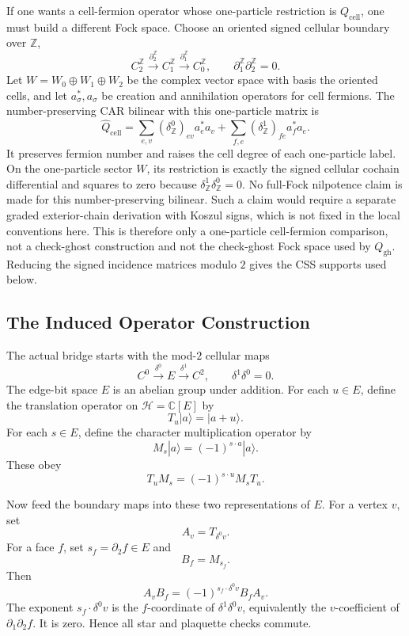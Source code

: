 If one wants a cell-fermion operator whose one-particle restriction is
\(Q_{\mathrm{cell}}\), one must build a different Fock space. Choose an
oriented signed cellular boundary over \(\mathbb Z\),
\[
  C_2^{\mathbb Z}\xrightarrow{\partial_2^{\mathbb Z}}
  C_1^{\mathbb Z}\xrightarrow{\partial_1^{\mathbb Z}} C_0^{\mathbb Z},
  \qquad
  \partial_1^{\mathbb Z}\partial_2^{\mathbb Z}=0.
\]
Let \(W=W_0\oplus W_1\oplus W_2\) be the complex vector space with basis the
oriented cells, and let \(a_\sigma^*,a_\sigma\) be creation and annihilation
operators for cell fermions. The number-preserving CAR bilinear with this
one-particle matrix is
\[
  \widehat Q_{\mathrm{cell}}
  =
  \sum_{e,v}(\delta^0_{\mathbb Z})_{ev}a_e^*a_v
  +
  \sum_{f,e}(\delta^1_{\mathbb Z})_{fe}a_f^*a_e .
\]
It preserves fermion number and raises the cell degree of each one-particle
label. On the one-particle sector \(W\), its restriction is exactly the signed
cellular cochain differential and squares to zero because
\(\delta^1_{\mathbb Z}\delta^0_{\mathbb Z}=0\). No full-Fock nilpotence claim is
made for this number-preserving bilinear. Such a claim would require a
separate graded exterior-chain derivation with Koszul signs, which is not fixed
in the local conventions here. This is therefore only a one-particle
cell-fermion comparison, not a check-ghost construction and not the
check-ghost Fock space used by \(Q_{\mathrm{gh}}\). Reducing the signed
incidence matrices modulo \(2\) gives the CSS supports used below.

\subsection{The Induced Operator Construction}

The actual bridge starts with the mod-\(2\) cellular maps
\[
  C^0\xrightarrow{\delta^0}E\xrightarrow{\delta^1}C^2,
  \qquad \delta^1\delta^0=0.
\]
The edge-bit space \(E\) is an abelian group under addition. For each
\(u\in E\), define the translation operator on \(\mathcal H=\mathbb C[E]\) by
\[
  T_u|a\rangle=|a+u\rangle .
\]
For each \(s\in E\), define the character multiplication operator by
\[
  M_s|a\rangle=(-1)^{s\cdot a}|a\rangle .
\]
These obey
\[
  T_uM_s=(-1)^{s\cdot u}M_sT_u.
\]

Now feed the boundary maps into these two representations of \(E\). For a
vertex \(v\), set
\[
  A_v=T_{\delta^0 v}.
\]
For a face \(f\), set \(s_f=\partial_2 f\in E\) and
\[
  B_f=M_{s_f}.
\]
Then
\[
  A_vB_f=(-1)^{s_f\cdot\delta^0v}B_fA_v.
\]
The exponent \(s_f\cdot\delta^0v\) is the \(f\)-coordinate of
\(\delta^1\delta^0v\), equivalently the \(v\)-coefficient of
\(\partial_1\partial_2f\). It is zero. Hence all star and plaquette checks
commute.

